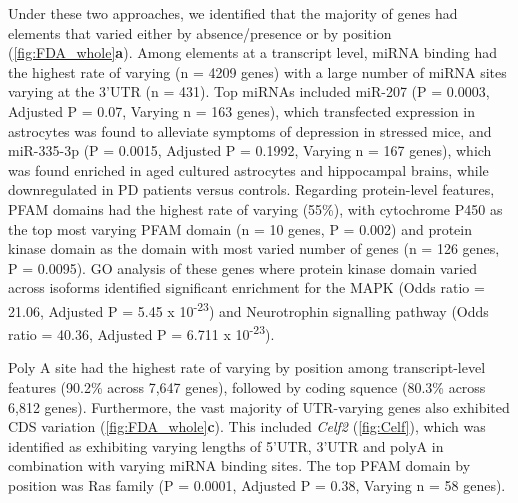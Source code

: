 Under these two approaches, we identified that the majority of genes had elements that varied either by absence/presence or by position (\cref{fig:FDA_whole}\textbf{a}). Among elements at a transcript level, miRNA binding had the highest rate of varying (n = 4209 genes) with a large number of miRNA sites varying at the 3'UTR (n = 431). Top miRNAs included miR-207 (P = 0.0003, Adjusted P = 0.07, Varying n = 163 genes), which transfected expression in astrocytes was found to alleviate symptoms of depression in stressed mice\cite{Li2020}, and miR-335-3p (P = 0.0015, Adjusted P = 0.1992, Varying n = 167 genes), which was found enriched in aged cultured astrocytes and hippocampal brains\cite{Raihan2018}, while downregulated in PD patients versus controls\cite{Oliveira2020}. 
Regarding protein-level features, PFAM domains had the highest rate of varying (55\%), with cytochrome P450 as the top most varying PFAM domain (n = 10 genes, P = 0.002) and protein kinase domain as the domain with most varied number of genes (n = 126 genes, P = 0.0095). GO analysis of these genes where protein kinase domain varied across isoforms identified significant enrichment for the MAPK (Odds ratio = 21.06, Adjusted P = 5.45 x 10\textsuperscript{-23}) and Neurotrophin signalling pathway (Odds ratio = 40.36, Adjusted P = 6.711 x 10\textsuperscript{-23}). 

Poly A site had the highest rate of varying by position among transcript-level features (90.2\% across 7,647 genes), followed by coding squence (80.3\% across 6,812 genes). Furthermore, the vast majority of UTR-varying genes also exhibited CDS variation (\cref{fig:FDA_whole}\textbf{c}). This included \textit{Celf2} (\cref{fig:Celf}), which was identified as exhibiting varying lengths of 5'UTR, 3'UTR and polyA in combination with varying miRNA binding sites. The top PFAM domain by position was Ras family (P = 0.0001, Adjusted P = 0.38, Varying n = 58 genes). 

